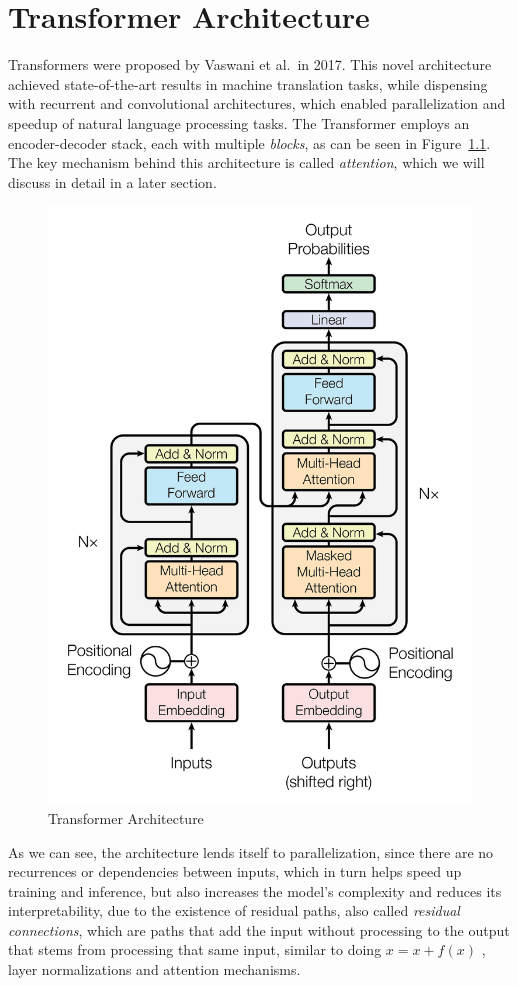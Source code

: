 \chapter{Transformer Architecture} \label{chapter:3}
Transformers \cite{attention_is_all_you_need} were proposed by Vaswani et al.\ in 2017. This novel architecture achieved state-of-the-art results in machine translation tasks, while dispensing with recurrent and convolutional architectures, which enabled parallelization and speedup of natural language processing tasks. The Transformer employs an encoder-decoder stack, each with multiple \emph{blocks}, as can be seen in Figure~\ref{fig:transformer}. The key mechanism behind this architecture is called \emph{attention}, which we will discuss in detail in a later section.

\begin{figure}[h]
    \centering
    \includegraphics[width=0.6\linewidth]{figs/transformer.png}
    \caption{Transformer Architecture \cite{attention_is_all_you_need}}
    \label{fig:transformer}
\end{figure}

As we can see, the architecture lends itself to parallelization, since there are no recurrences or dependencies between inputs, which in turn helps speed up training and inference, but also increases the model's complexity and reduces its interpretability, due to the existence of residual paths, also called \emph{residual connections}, which are paths that add the input without processing to the output that stems from processing that same input, similar to doing $x = x + f(x)$ , layer normalizations and attention mechanisms.

